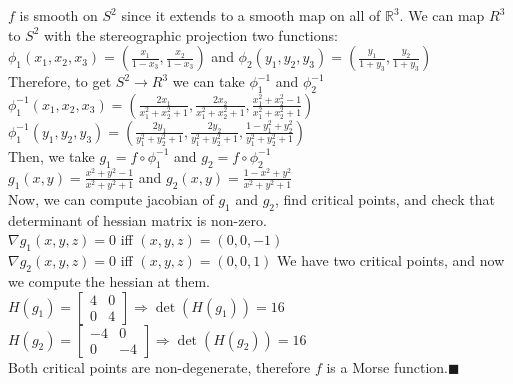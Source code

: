 \documentclass[]{article}
\newcommand{\R}{\mathbb{R}}
\newcommand{\imply}{\Rightarrow}
\begin{document}
$f$ is smooth on $ S^2 $ since it extends to a smooth map on all of $\R^3$. We can map $R^3$ to $S^2$ with the stereographic projection two functions:\\
$
	\phi_1(x_1,x_2,x_3) = (\frac{x_1}{1-x_3}, \frac{x_2}{1-x_3} ) 
$
and
$
	\phi_2(y_1,y_2,y_3) = (\frac{y_1}{1+y_3},\frac{y_2}{1+y_3})
$\\
Therefore, to get $S^2 \to R^3$ we can take $\phi_1^{-1}$ and $\phi_2^{-1}$ \\
$
	\phi_1^{-1}(x_1,x_2,x_3) = (\frac{2x_1}{x_1^2+x_2^2+1}, \frac{2x_2}{x_1^2+x_2^2+1}, \frac{x_1^2+x_2^2-1}{x_1^2+x_2^2+1})
$\\
$
	\phi_1^{-1}(y_1,y_2,y_3) = (\frac{2y_1}{y_1^2+y_2^2+1}, \frac{2y_2}{y_1^2+y_2^2+1}, \frac{1-y_1^2+y_2^2}{y_1^2+y_2^2+1})
$\\
Then, we take $g_1 = f \circ \phi_1^{-1}$ and $g_2 = f \circ \phi_2^{-1}$ \\
$
	g_1(x,y) =  \frac{x^2+y^2-1}{x^2+y^2+1}
$
and
$
	g_2(x,y) = \frac{1-x^2+y^2}{x^2+y^2+1}
$ \\
Now, we can compute jacobian of $g_1$ and $g_2$, find critical points, and check that determinant of hessian matrix is non-zero. \\
$
	\nabla g_1(x,y,z) = 0$ iff $(x,y,z) = (0,0,-1)
$\\
$
	\nabla g_2(x,y,z) = 0$ iff $ (x,y,z) = (0,0,1)
$
We have two critical points, and now we compute the hessian at them.\\

$
	H(g_1) = \begin{bmatrix} 4 & 0 \\ 0 & 4 \end{bmatrix}
	\imply \det(H(g_1)) = 16
$ \\

$
	H(g_2) = \begin{bmatrix} -4 & 0 \\ 0 & -4 \end{bmatrix}
	\imply \det(H(g_2)) =  16
$ \\ 

Both critical points are non-degenerate, therefore $f$ is a Morse function.$\blacksquare$\\
\\
\\
\end{document}
